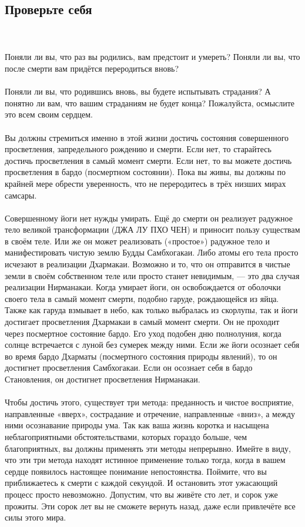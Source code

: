 \subsection{Проверьте себя}
\\ \\ Поняли ли вы, что раз вы родились, вам предстоит и умереть? Поняли ли вы, что после смерти вам придётся переродиться вновь?
\\ \\ Поняли ли вы, что родившись вновь, вы будете испытывать страдания? А понятно ли вам, что вашим страданиям не будет конца? Пожалуйста, осмыслите это всем своим сердцем.
\\ \\ Вы должны стремиться именно в этой жизни достичь состояния совершенного просветления, запредельного рождению и смер\-ти. Если нет, то старайтесь достичь просветления в самый момент смерти. Если нет, то вы можете достичь просветления в бардо (посмертном состоянии). Пока вы живы, вы должны по крайней мере обрести уверенность, что не переродитесь в трёх низших мирах самсары.
\\ \\ Совершенному йоги нет нужды умирать. Ещё до смерти он реализует радужное тело великой трансформации (ДЖА ЛУ ПХО ЧЕН) и приносит пользу существам в своём теле. Или же он может реализовать («простое») радужное тело и манифестировать чистую землю Будды Самбхогакаи. Либо атомы его тела просто исчезают в реализации Дхармакаи. Возможно и то, что он отправится в чистые земли в своём собственном теле или просто станет невидимым, — это два случая реализации Нирманакаи. Когда умирает йоги, он освобождается от оболочки своего тела в самый момент смерти, подобно гаруде, рождающейся из яйца. Также как гаруда взмывает в небо, как только выбралась из скорлупы, так и йоги достигает просветления Дхармакаи в самый момент смерти. Он не проходит через посмертное состояние бардо. Его уход подобен дню полнолуния, когда солнце встречается с луной без сумерек между ними. Если же йоги осознает себя во время бардо Дхарматы (посмертного состояния природы явлений), то он достигнет просветления Самбхогакаи. Если он осознает себя в бардо Становления, он достигнет просветления Нирманакаи.
\\ \\ Чтобы достичь этого, существует три метода: преданность и чистое восприятие, направленные «вверх», сострадание и отречение, направленные «вниз», а между ними осознавание природы ума. Так как ваша жизнь коротка и насыщена неблагоприятными обстоятельствами, которых гораздо боль\-ше, чем благоприятных, вы должны применять эти методы непрерывно. Имейте в виду, что эти три метода находят истинное применение только тогда, когда в вашем сердце появилось настоящее понимание непостоянства. Поймите, что вы приближаетесь к смерти с каждой секундой. И остановить этот ужасающий процесс просто невозможно. Допустим, что вы живёте сто лет, и сорок уже прожиты. Эти сорок лет вы не сможете вернуть назад, даже если привлечёте все силы этого мира.
